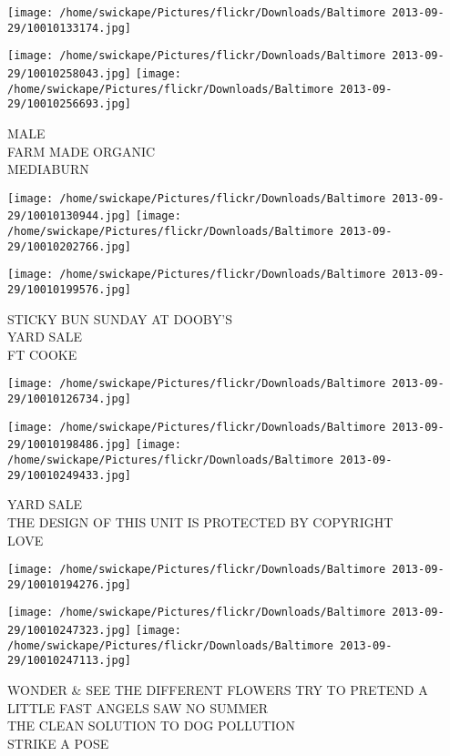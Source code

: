 \documentclass[10pt,letterpaper]{article}
\begin{document}
\texttt{[image: /home/swickape/Pictures/flickr/Downloads/Baltimore 2013-09-29/10010133174.jpg]}

\vspace{0.25in}
\texttt{[image: /home/swickape/Pictures/flickr/Downloads/Baltimore 2013-09-29/10010258043.jpg]}
\texttt{[image: /home/swickape/Pictures/flickr/Downloads/Baltimore 2013-09-29/10010256693.jpg]}

MALE\\
FARM MADE ORGANIC\\
MEDIABURN
\pagebreak

\texttt{[image: /home/swickape/Pictures/flickr/Downloads/Baltimore 2013-09-29/10010130944.jpg]}
\texttt{[image: /home/swickape/Pictures/flickr/Downloads/Baltimore 2013-09-29/10010202766.jpg]}

\texttt{[image: /home/swickape/Pictures/flickr/Downloads/Baltimore 2013-09-29/10010199576.jpg]}

STICKY BUN SUNDAY AT DOOBY'S\\
YARD SALE\\
FT COOKE
\pagebreak

\texttt{[image: /home/swickape/Pictures/flickr/Downloads/Baltimore 2013-09-29/10010126734.jpg]}

\vspace{0.25in}
\texttt{[image: /home/swickape/Pictures/flickr/Downloads/Baltimore 2013-09-29/10010198486.jpg]}
\texttt{[image: /home/swickape/Pictures/flickr/Downloads/Baltimore 2013-09-29/10010249433.jpg]}

YARD SALE\\
THE DESIGN OF THIS UNIT IS PROTECTED BY COPYRIGHT\\
LOVE
\pagebreak

\texttt{[image: /home/swickape/Pictures/flickr/Downloads/Baltimore 2013-09-29/10010194276.jpg]}

\vspace{0.25in}
\texttt{[image: /home/swickape/Pictures/flickr/Downloads/Baltimore 2013-09-29/10010247323.jpg]}
\texttt{[image: /home/swickape/Pictures/flickr/Downloads/Baltimore 2013-09-29/10010247113.jpg]}

WONDER \& SEE THE DIFFERENT FLOWERS TRY TO PRETEND A LITTLE FAST ANGELS SAW NO SUMMER\\
THE CLEAN SOLUTION TO DOG POLLUTION\\
STRIKE A POSE
\pagebreak
\end{document}
